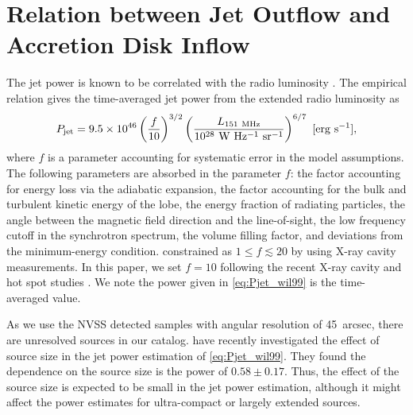 \documentclass[preprint2,twocolappendix]{aastex6}
\begin{document}
\section{Relation between Jet Outflow and Accretion Disk Inflow}
\label{sec:jet-disk}

The jet power is known to be correlated with the radio luminosity \citep[e.g.][]{wil99,osu11}. The empirical relation gives the time-averaged jet power from the extended radio luminosity as \citep{wil99}
\begin{equation}
P_{\rm jet} = 9.5\times10^{46} \left(\frac{f}{10}\right)^{3/2} \left(\frac{L_{\rm 151~MHz}}{10^{28}~{\rm W~Hz^{-1}~sr^{-1}}}\right)^{6/7}~[{\rm erg~s^{-1}}],
\label{eq:Pjet_wil99}
\end{equation}
where $f$ is a parameter accounting for systematic error in the model assumptions. The following parameters are absorbed in the parameter $f$: the factor accounting for energy loss via the adiabatic expansion, the factor accounting for the bulk and turbulent kinetic energy of the lobe, the energy fraction of radiating particles, the angle between the magnetic field direction and the line-of-sight, the low frequency cutoff in the synchrotron spectrum, the volume filling factor, and deviations from the minimum-energy condition. \citet{wil99} constrained as $1\le f \lesssim 20$ by using X-ray cavity measurements. In this paper, we set $f=10$ following the recent X-ray cavity and hot spot studies \citep[][]{blu00,god13}. We note the power given in \autoref{eq:Pjet_wil99} is the time-averaged value.

As we use the NVSS detected samples with angular resolution of 45~arcsec, there are unresolved sources in our catalog. \citet{sha13} have recently investigated the effect of source size in the jet power estimation of \autoref{eq:Pjet_wil99}. They found the dependence on the source size is the power of $0.58\pm0.17$. Thus, the effect of the source size is expected to be small in the jet power estimation, although it might affect the power estimates for ultra-compact or largely extended sources. 
\end{document}
